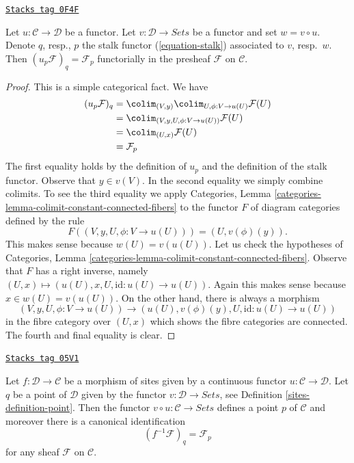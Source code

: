 \begin{lemma}
\label{sites-lemma-point-functor}
\href{https://stacks.math.columbia.edu/tag/0F4F}{\texttt{Stacks tag 0F4F}}

Let $u : \mathcal{C} \to \mathcal{D}$ be a functor. Let
$v : \mathcal{D} \to \textit{Sets}$ be a functor and set
$w = v \circ u$. Denote $q$, resp., $p$ the stalk functor
(\ref{equation-stalk}) associated to $v$, resp.\ $w$.
Then $(u_p\mathcal{F})_q = \mathcal{F}_p$ functorially in the
presheaf $\mathcal{F}$ on $\mathcal{C}$.
\end{lemma}

\begin{proof}
This is a simple categorical fact. We have
\begin{align*}
(u_p\mathcal{F})_q
& =
\colim_{(V, y)} \colim_{U, \phi : V \to u(U)} \mathcal{F}(U) \\
& = \colim_{(V, y, U, \phi : V \to u(U))} \mathcal{F}(U) \\
& = \colim_{(U, x)} \mathcal{F}(U) \\
& = \mathcal{F}_p
\end{align*}
The first equality holds by the definition of $u_p$ and the
definition of the stalk functor. Observe that $y \in v(V)$.
In the second equality we simply combine colimits.
To see the third equality we apply
Categories, Lemma \ref{categories-lemma-colimit-constant-connected-fibers}
to the functor $F$ of diagram categories defined by the rule
$$
F((V, y, U, \phi : V \to u(U))) = (U, v(\phi)(y)).
$$
This makes sense because $w(U) = v(u(U))$. Let us check the hypotheses of
Categories, Lemma \ref{categories-lemma-colimit-constant-connected-fibers}.
Observe that $F$ has a right inverse, namely
$(U, x) \mapsto (u(U), x, U, \text{id} : u(U) \to u(U))$.
Again this makes sense because $x \in w(U) = v(u(U))$. On the other hand,
there is always a morphism
$$
(V, y, U, \phi : V \to u(U))
\longrightarrow
(u(U), v(\phi)(y), U, \text{id} : u(U) \to u(U))
$$
in the fibre category over $(U, x)$ which shows the fibre categories
are connected. The fourth and final equality is clear.
\end{proof}

\begin{lemma}
\label{sites-lemma-point-morphism-sites}
\href{https://stacks.math.columbia.edu/tag/05V1}{\texttt{Stacks tag 05V1}}


Let $f : \mathcal{D} \to \mathcal{C}$ be a morphism of sites
given by a continuous functor $u : \mathcal{C} \to \mathcal{D}$.
Let $q$ be a point of $\mathcal{D}$ given by the functor
$v : \mathcal{D} \to \textit{Sets}$, see
Definition \ref{sites-definition-point}.
Then the functor $v \circ u : \mathcal{C} \to \textit{Sets}$
defines a point $p$ of $\mathcal{C}$ and moreover there is
a canonical identification
$$
(f^{-1}\mathcal{F})_q = \mathcal{F}_p
$$
for any sheaf $\mathcal{F}$ on $\mathcal{C}$.
\end{lemma}

